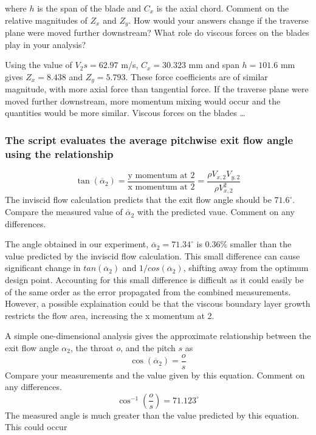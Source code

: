 \documentclass{article}
\begin{document}
where $h$ is the span of the blade and $C_x$ is the axial chord. Comment on the relative magnitudes
of $Z_x$ and $Z_y$. How would your answers change if the traverse plane were moved further
downstream? What role do viscous forces on the blades play in your analysis?

Using the value of $V_2s = 62.97$ m/s, $C_x = 30.323$ mm and span $h=101.6$ mm gives $Z_x = 8.438$ and $Z_y = 5.793$.
These force coefficients are of similar magnitude, with more axial force than tangential force.
If the traverse plane were moved further downstream, more momentum mixing would occur and the quantities would be more similar.
Viscous forces on the blades \dots

\subsubsection{The script evaluates the average pitchwise exit flow angle using the relationship
}
\begin{equation}
    \tan (\overline{\alpha}_2) = \frac{\text{y momentum at 2}}{\text{x momentum at 2}} = \frac{\rho V_{x,2}V_{y,2}}{\rho V_{x,2}^2} \label{eq:alpha2}
\end{equation}
The inviscid flow calculation predicts that the exit flow angle should be $71.6^\circ$. Compare the
measured value of $\overline{\alpha}_2$ with the predicted vaue. Comment on any differences.

The angle obtained in our experiment, $\overline{\alpha}_2 = 71.34^\circ$ is 0.36\% smaller than the value predicted by the inviscid flow calculation.
This small difference can cause significant change in $tan(\overline{\alpha}_2)$ and $1/cos(\overline{\alpha}_2)$, shifting away from the optimum design point.
Accounting for this small difference is difficult as it could easily be of the same order as the error propagated from the combined measurements.
However, a possible explaination could be that the viscous boundary layer growth restricts the flow area, increasing the x momentum at 2.


% 


A simple one-dimensional analysis gives the approximate relationship between the exit flow angle $\alpha_2$, the throat $o$, and the pitch $s$ as
\begin{equation}
    \cos (\overline{\alpha}_2) = \frac{o}{s}
\end{equation}
Compare your measurements and the value given by this equation. Comment on any
differences.
\begin{equation}
    \cos^{-1}\left( \frac{o}{s} \right) = 71.123^\circ
\end{equation}
The measured angle is much greater than the value predicted by this equation.
This could occur 
\end{document}
